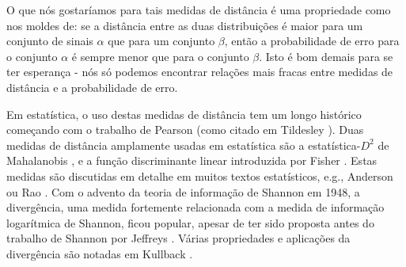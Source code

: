 \documentclass{sbrt2017port}
\begin{document}
O que nós gostaríamos para tais medidas de distância é uma propriedade como nos moldes de: se a distância entre as duas distribuições é maior para um conjunto de sinais $\alpha$ que para um conjunto $\beta$, então a probabilidade de erro para o conjunto $\alpha$ é sempre menor que para o conjunto $\beta$.
Isto é bom demais para se ter esperança - nós só podemos encontrar relações mais fracas entre medidas de distância e a probabilidade de erro.

Em estatística, o uso destas medidas de distância tem um longo histórico começando com o trabalho de Pearson (como citado em Tildesley \cite{r1}).
Duas medidas de distância amplamente usadas em estatística são a estatística-$D^2$ de Mahalanobis \cite{r2}, \cite{r3} e a função discriminante linear introduzida por Fisher \cite{r4}.
Estas medidas são discutidas em detalhe em muitos textos estatísticos, e.g., Anderson \cite{r5} ou Rao \cite{r6}. Com o advento da teoria de informação de Shannon em 1948, a divergência, uma medida fortemente relacionada com a medida de informação logarítmica de Shannon, ficou popular, apesar de ter sido proposta antes do trabalho de Shannon por Jeffreys \cite{r7}. Várias propriedades e aplicações da divergência são notadas em Kullback \cite{r8}.
\end{document}

